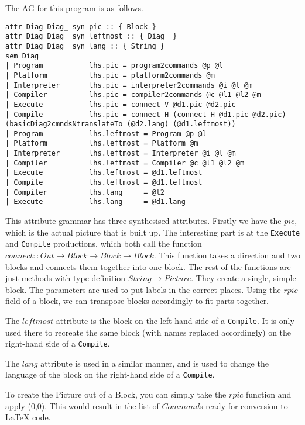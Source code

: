 \documentclass[10pt,a4paper,onecolumn]{article}
\begin{document}
		The AG for this program is as follows.

\begin{lstlisting}
attr Diag Diag_ syn pic :: { Block }
attr Diag Diag_ syn leftmost :: { Diag_ }
attr Diag Diag_ syn lang :: { String }
sem Diag_
| Program           lhs.pic = program2commands @p @l
| Platform          lhs.pic = platform2commands @m
| Interpreter       lhs.pic = interpreter2commands @i @l @m
| Compiler          lhs.pic = compiler2commands @c @l1 @l2 @m
| Execute           lhs.pic = connect V @d1.pic @d2.pic 
| Compile           lhs.pic = connect H (connect H @d1.pic @d2.pic) (basicDiag2cmndsNtranslateTo (@d2.lang) (@d1.leftmost)) 
| Program           lhs.leftmost = Program @p @l
| Platform          lhs.leftmost = Platform @m
| Interpreter       lhs.leftmost = Interpreter @i @l @m
| Compiler          lhs.leftmost = Compiler @c @l1 @l2 @m
| Execute           lhs.leftmost = @d1.leftmost
| Compile           lhs.leftmost = @d1.leftmost
| Compiler          lhs.lang     = @l2 
| Execute           lhs.lang     = @d1.lang
\end{lstlisting}

		This attribute grammar has three synthesised attributes.
		Firstly we have the $pic$, which is the actual picture that is built up.
		The interesting part is at the \texttt{Execute} and \texttt{Compile} productions, which both call the function $ connect :: Out \rightarrow Block \rightarrow Block \rightarrow Block $.
		This function takes a direction and two blocks and connects them together into one block.
		The rest of the functions are just methods with type definition $ String \rightarrow Picture $.
		They create a single, simple block. The parameters are used to put labels in the correct places.
		Using the $ rpic $ field of a block, we can transpose blocks accordingly to fit parts together.

		The $ leftmost $ attribute is the block on the left-hand side of a \texttt{Compile}.
  		It is only used there to recreate the same block (with names replaced accordingly) on the right-hand side of a \texttt{Compile}.

		The $ lang $ attribute is used in a similar manner, and is used to change the language of the block on the right-hand side of a \texttt{Compile}.

		To create the Picture out of a Block, you can simply take the $ rpic $ function and apply (0,0).
		This would result in the list of $ Command $s ready for conversion to LaTeX code.
\end{document}
